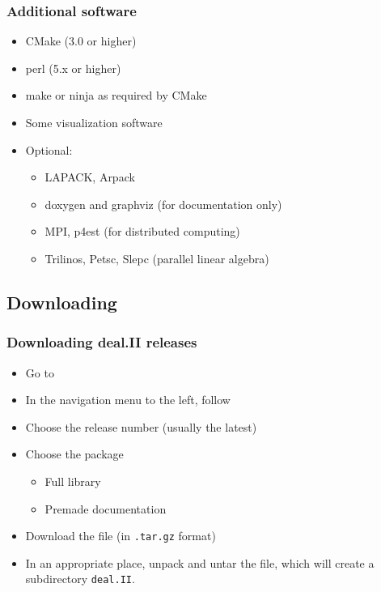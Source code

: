 \begin{frame}
  \frametitle{Additional software}
  \begin{itemize}
  \item CMake (3.0 or higher)
  \item perl (5.x or higher)
  \item make or ninja as required by CMake
  \item Some visualization software
    \item Optional: 
    \begin{itemize}
    \item LAPACK, Arpack
    \item doxygen and graphviz (for documentation only)
    \item MPI, p4est (for distributed computing)
    \item Trilinos, Petsc, Slepc (parallel linear algebra)
    \end{itemize}
  \end{itemize}
\end{frame}

\subsection{Downloading}

\begin{frame}
  \frametitle{Downloading deal.II releases}
  \begin{itemize}
  \item Go to \texttt{}
  \item In the navigation menu to the left, follow
  \item Choose the release number (usually the latest)
  \item Choose the package
    \begin{itemize}
    \item Full library
    \item Premade documentation
    \end{itemize}
  \item Download the file (in \texttt{.tar.gz} format)
  \item In an appropriate place, unpack and untar the file, which will
    create a subdirectory \texttt{deal.II}.
  \end{itemize}
\end{frame}

